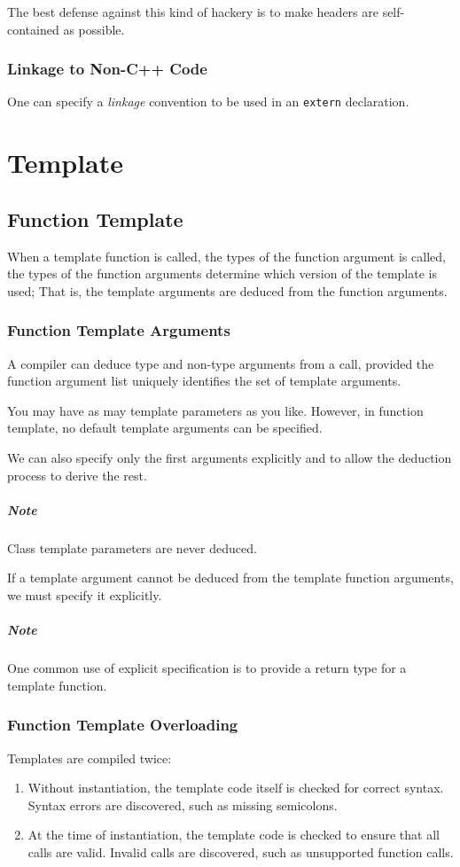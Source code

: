 \documentclass[11pt, a4paper]{book}
\begin{document}
\begin{itemize}
The best defense against this kind of hackery is to make headers are self-contained as possible.
\subsection{Linkage to Non-C++ Code}
One can specify a \emph{linkage} convention to be used in an \verb|extern| declaration. 

\chapter{Template}
\section{Function Template}
When a template function is called, the types of the function argument is called, the types of the function arguments determine which version of the template is used; That is, the template arguments are deduced from the function arguments. 
\subsection{Function Template Arguments}
A compiler can deduce type and non-type arguments from a call, provided the function argument list uniquely identifies the set of template arguments. 

You may have as may template parameters as you like. However, in function template, no default template arguments can be specified.

We can also specify only the first arguments explicitly and to allow the deduction process to derive the rest.

\paragraph{Note} Class template parameters are never deduced.

If a template argument cannot be deduced from the template function arguments, we must specify it explicitly.
\paragraph{Note} One common use of explicit specification is to provide a return type for a template function.
\subsection{Function Template Overloading}
Templates are compiled twice:
\begin{enumerate}
\item Without instantiation, the template code itself is checked for correct syntax. Syntax errors are discovered, such as missing semicolons.
\item At the time of instantiation, the template code is checked to ensure that all calls are valid. Invalid calls are discovered, such as unsupported function calls.


\end{enumerate}
\end{itemize}
\end{document}
